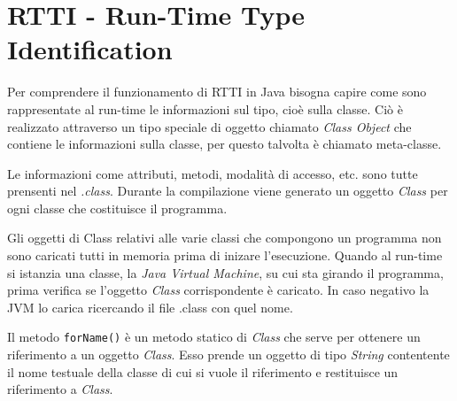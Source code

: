 \documentclass[12pt]{report}
\begin{document}
\section{RTTI - Run-Time Type Identification}
Per comprendere il funzionamento di RTTI in Java bisogna capire come sono rappresentate al run-time le informazioni sul tipo, cioè sulla classe. Ciò è realizzato attraverso un tipo speciale di oggetto chiamato \textit{Class Object} che contiene le informazioni sulla classe, per questo talvolta è chiamato meta-classe.

Le informazioni come attributi, metodi, modalità di accesso, etc. sono tutte prensenti nel \textit{.class}.
Durante la compilazione viene generato un oggetto \textit{Class} per ogni classe che costituisce il programma.

Gli oggetti di Class relativi alle varie classi che compongono un programma non sono caricati tutti in memoria prima di inizare l'esecuzione. Quando al run-time si istanzia una classe, la \textit{Java Virtual Machine}, su cui sta girando il programma, prima verifica se l'oggetto \textit{Class} corrispondente è caricato. In caso negativo la JVM lo carica ricercando il file .class con quel nome.

Il metodo \texttt{forName()} è un metodo statico di \textit{Class} che serve per ottenere un riferimento a un oggetto \textit{Class}. Esso prende un oggetto di tipo \textit{String} contentente il nome testuale della classe di cui si vuole il riferimento e restituisce un riferimento a \textit{Class}.
\end{document}

